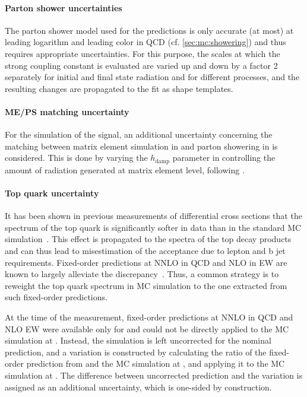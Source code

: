 \paragraph{Parton shower uncertainties}

The parton shower model used for the predictions is only accurate (at most) at leading logarithm and leading color in QCD (cf. \cref{sec:mc:showering}) and thus requires appropriate uncertainties. For this purpose, the scales at which the strong coupling constant is evaluated are varied up and down by a factor 2 separately for initial and final state radiation and for different processes, and the resulting changes are propagated to the fit as shape templates.

\paragraph{ME/PS matching uncertainty}

For the simulation of the \ttbar signal, an additional uncertainty concerning the matching between matrix element simulation in \powheg and parton showering in \pythia is considered. This is done by varying the $h_{\mathrm{damp}}$ parameter in \powheg controlling the amount of radiation generated at matrix element level, following .

\paragraph{Top quark \pt uncertainty}

It has been shown in previous measurements of \ttbar differential cross sections that the \pt spectrum of the top quark is significantly softer in data than in the standard \powheg MC simulation~\cite{CMS:TOP-17-014,CMS:TOP-16-007,CMS:TOP-16-008}. This effect is propagated to the \pt spectra of the top decay products and can thus lead to misestimation of the acceptance due to lepton and b jet \pt requirements. Fixed-order predictions at NNLO in QCD and NLO in EW are known to largely alleviate the discrepancy~\cite{Czakon:2017wor}. Thus, a common strategy is to reweight the top quark \pt spectrum in MC simulation to the one extracted from such fixed-order predictions.

At the time of the measurement, fixed-order predictions at NNLO in QCD and NLO EW were available only for \sqrtsRII and could not be directly applied to the MC simulation at \sqrtsRIII. Instead, the simulation is left uncorrected for the nominal prediction, and a variation is constructed by calculating the ratio of the fixed-order prediction from  and the \powheg MC simulation at \sqrtsRII, and applying it to the \powheg MC simulation at \sqrtsRIII. The difference between uncorrected prediction and the variation is assigned as an additional uncertainty, which is one-sided by construction.

